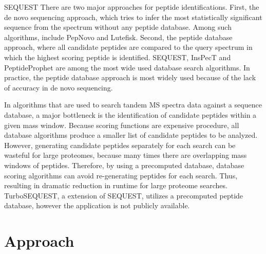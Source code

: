 \documentclass{bioinfo}
\begin{document}
SEQUEST\citep{eng:approach} There are two major approaches for peptide
identifications. First, the de novo sequencing approach, which tries
to infer the most statistically significant sequence from the spectrum
without any peptide database. Among such algorithms, include PepNovo
and Lutefisk. Second, the peptide database approach, where all
candidate peptides are compared to the query spectrum in which the
highest scoring peptide is identified. SEQUEST, InsPecT and
PeptideProphet are among the most wide used database search
algorithms. In practice, the peptide database approach is most widely
used because of the lack of accuracy in de novo sequencing.

In algorithms that are used to search tandem MS spectra data against a
sequence database, a major bottleneck is the identification of
candidate peptides within a given mass window. Because scoring
functions are expensive procedure, all database algorithms produce a
smaller list of candidate peptides to be analyzed. However, generating
candidate peptides separately for each search can be wasteful for
large proteomes, because many times there are overlapping mass windows
of peptides. Therefore, by using a precomputed database, database
scoring algorithms can avoid re-generating peptides for each
search. Thus, resulting in dramatic reduction in runtime for large
proteome searches. TurboSEQUEST, a extension of SEQUEST, utilizes a
precomputed peptide database, however the application is not publicly
available.



\section{Approach}
\end{document}
